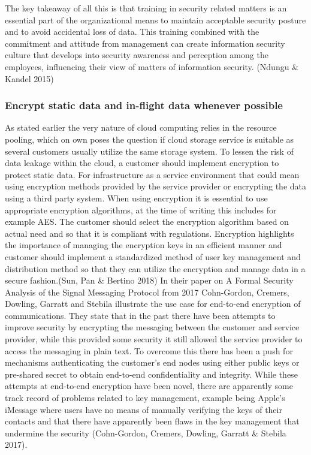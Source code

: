 \documentclass{article}
\begin{document}
\par
The key takeaway of all this is that training in security related matters is an essential part of the organizational means to maintain acceptable security posture and to avoid accidental loss of data. This training combined with the commitment and attitude from management can create information security culture that develops into security awareness and perception among the employees, influencing their view of matters of information security. (Ndungu \& Kandel 2015) 
\subsubsection{Encrypt static data and in-flight data whenever possible}
As stated earlier the very nature of cloud computing relies in the resource pooling, which on own poses the question if cloud storage service is suitable as several customers usually utilize the same storage system. To lessen the risk of data leakage within the cloud, a customer should implement encryption to protect static data. For infrastructure as a service environment that could mean using encryption methods provided by the service provider or encrypting the data using a third party system. When using encryption it is essential to use appropriate encryption algorithms, at the time of writing this includes for example AES. The customer should select the encryption algorithm based on actual need and so that it is compliant with regulations. Encryption highlights the importance of managing the encryption keys in an efficient manner and customer should implement a standardized method of user key management and distribution method so that they can utilize the encryption and manage data in a secure fashion.(Sun, Pan \& Bertino 2018)
In their paper on A Formal Security Analysis of the Signal Messaging Protocol from 2017 Cohn-Gordon, Cremers, Dowling, Garratt and Stebila illustrate the use case for end-to-end encryption of communications.
They state that in the past there have been attempts to improve security by encrypting the messaging between the customer and service provider, while this provided some security it still allowed the service provider to access the messaging in plain text.
To overcome this there has been a push for mechanisms authenticating the customer's end nodes using either public keys or pre-shared secret to obtain end-to-end confidentiality and integrity.
While these attempts at end-to-end encryption have been novel, there are apparently some track record of problems related to key management, example being Apple's iMessage where users have no means of manually verifying the keys of their contacts and that there have apparently been flaws in the key management that undermine the security (Cohn-Gordon, Cremers, Dowling, Garratt \& Stebila 2017).
\end{document}
